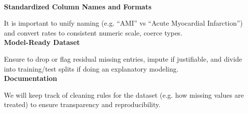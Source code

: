 \documentclass{article}
\theoremstyle{plain}
\theoremstyle{definition}
\theoremstyle{remark}
\begin{document}
\\ \textbf{Standardized Column Names and Formats} 

It is important to unify naming (e.g. “AMI” vs “Acute Myocardial Infarction”) and convert rates to consistent numeric scale, coerce types. \\

\textbf{Model-Ready Dataset} 

Ensure to drop or flag residual missing entries, impute if justifiable, and divide into training/test splits if doing an explanatory modeling. \\

\textbf{Documentation} 

We will keep track of cleaning rules for the dataset (e.g. how missing values are treated) to ensure transparency and reproducibility.
\end{document}
